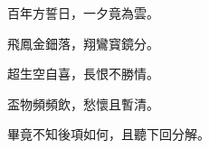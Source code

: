 \begin{myquote}
百年方誓日，一夕竟為雲。

飛鳳金鈿落，翔鸞寳鏡分。

超生空自喜，長恨不勝情。

盃物頻頻飲，愁懷且暫清。
\end{myquote}

畢竟不知後項如何，且聽下回分解。

